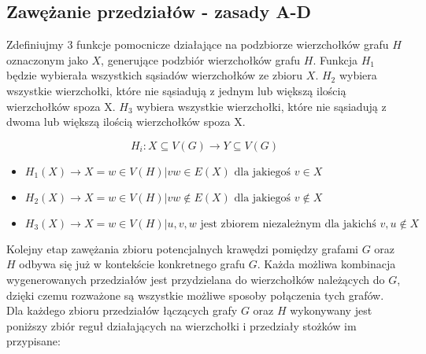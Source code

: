 \documentclass[11pt]{article}
\begin{document}
\subsection{Zawężanie przedziałów - zasady A-D}
Zdefiniujmy 3 funkcje pomocnicze działające na podzbiorze wierzchołków grafu $H$ oznaczonym jako $X$, generujące podzbiór wierzchołków grafu $H$. 
Funkcja $H_1$ będzie wybierała wszystkich sąsiadów wierzchołków ze zbioru $X$.
$H_2$ wybiera wszystkie wierzchołki, które nie sąsiadują z jednym lub większą ilością wierzchołków spoza X. 
$H_3$ wybiera wszystkie wierzchołki, które nie sąsiadują z dwoma lub większą ilością wierzchołków spoza X.

$$H_i: X \subseteq V(G) \to Y \subseteq V(G)$$

\begin{itemize}
    
  \item   $H_1(X) \to X = { w \in V(H) | vw \in E(X) \textrm{ dla jakiegoś } v \in X }$ 
  
  \item   $H_2(X) \to X = { w \in V(H) | vw \notin E(X) \textrm{ dla jakiegoś } v \notin X}$
  
  \item   $H_3(X) \to X = { w \in V(H) | { u, v, w } \textrm{ jest zbiorem niezależnym dla jakichś } v, u \notin X}$ 
\end{itemize}
Kolejny etap zawężania zbioru potencjalnych krawędzi pomiędzy grafami $G$ oraz $H$ odbywa się już w kontekście konkretnego grafu $G$. Każda możliwa kombinacja wygenerowanych przedziałów jest  przydzielana do wierzchołków należących do $G$, dzięki czemu rozważone są wszystkie możliwe sposoby połączenia tych grafów. Dla każdego zbioru przedziałów łączących grafy $G$ oraz $H$ wykonywany jest poniższy zbiór reguł działających na wierzchołki i przedziały stożków im przypisane:
\end{document}
